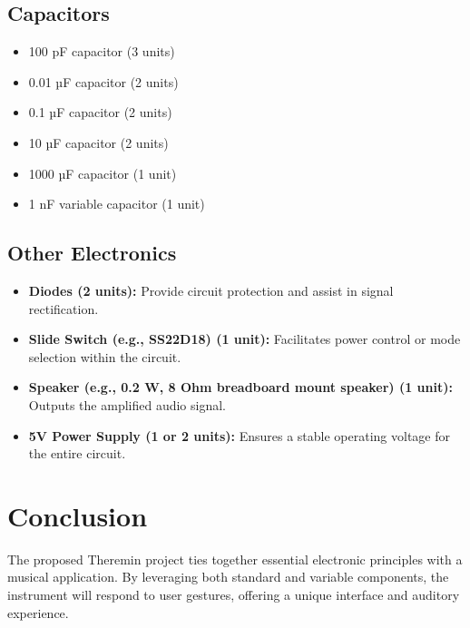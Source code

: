 \documentclass{article}
\numberwithin{equation}{section}
\begin{document}
\subsection*{Capacitors}
\begin{itemize}
    \item 100 pF capacitor (3 units)
    \item 0.01 µF capacitor (2 units)
    \item 0.1 µF capacitor (2 units)
    \item 10 µF capacitor (2 units)
    \item 1000 µF capacitor (1 unit)
    \item 1 nF variable capacitor (1 unit)
\end{itemize}

\subsection*{Other Electronics}
\begin{itemize}
    \item \textbf{Diodes (2 units):} Provide circuit protection and assist in signal rectification.
    \item \textbf{Slide Switch (e.g., SS22D18) (1 unit):} Facilitates power control or mode selection within the circuit.
    \item \textbf{Speaker (e.g., 0.2 W, 8 Ohm breadboard mount speaker) (1 unit):} Outputs the amplified audio signal.
    \item \textbf{5V Power Supply (1 or 2 units):} Ensures a stable operating voltage for the entire circuit.
\end{itemize}

\section{Conclusion}
The proposed Theremin project ties together essential electronic principles with a musical application. By leveraging both standard and variable components, the instrument will respond to user gestures, offering a unique interface and auditory experience.
\end{document}
